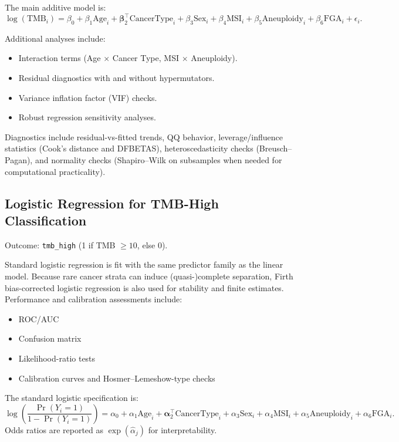 \documentclass[11pt]{article}
\begin{document}
The main additive model is:
\[
\log(\text{TMB}_i) =
\beta_0 + \beta_1 \text{Age}_i + \boldsymbol{\beta}_2^\top \text{CancerType}_i +
\beta_3 \text{Sex}_i + \beta_4 \text{MSI}_i + \beta_5 \text{Aneuploidy}_i +
\beta_6 \text{FGA}_i + \epsilon_i.
\]

Additional analyses include:
\begin{itemize}
    \item Interaction terms (Age $\times$ Cancer Type, MSI $\times$ Aneuploidy).
    \item Residual diagnostics with and without hypermutators.
    \item Variance inflation factor (VIF) checks.
    \item Robust regression sensitivity analyses.
\end{itemize}

Diagnostics include residual-vs-fitted trends, QQ behavior, leverage/influence statistics (Cook's distance and DFBETAS), heteroscedasticity checks (Breusch--Pagan), and normality checks (Shapiro--Wilk on subsamples when needed for computational practicality).

\subsection{Logistic Regression for TMB-High Classification}
Outcome: \texttt{tmb\_high} (1 if TMB $\ge 10$, else 0).

Standard logistic regression is fit with the same predictor family as the linear model. Because rare cancer strata can induce (quasi-)complete separation, Firth bias-corrected logistic regression is also used for stability and finite estimates. Performance and calibration assessments include:
\begin{itemize}
    \item ROC/AUC
    \item Confusion matrix
    \item Likelihood-ratio tests
    \item Calibration curves and Hosmer--Lemeshow-type checks
\end{itemize}

The standard logistic specification is:
\[
\log\left(\frac{\Pr(Y_i=1)}{1-\Pr(Y_i=1)}\right) =
\alpha_0 + \alpha_1 \text{Age}_i + \boldsymbol{\alpha}_2^\top \text{CancerType}_i +
\alpha_3 \text{Sex}_i + \alpha_4 \text{MSI}_i + \alpha_5 \text{Aneuploidy}_i +
\alpha_6 \text{FGA}_i.
\]
Odds ratios are reported as $\exp(\hat{\alpha}_j)$ for interpretability.
\end{document}
